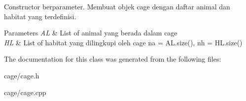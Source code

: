 Constructor berparameter. Membuat objek cage dengan daftar animal dan habitat yang terdefinisi. 


\begin{DoxyParams}{Parameters}
{\em AL} & List of animal yang berada dalam cage \\
\hline
{\em HL} & List of habitat yang dilingkupi oleh cage na = A\+L.\+size(), nh = H\+L.\+size() \\
\hline
\end{DoxyParams}


The documentation for this class was generated from the following files\+:\begin{DoxyCompactItemize}
\item 
cage/cage.\+h\item 
cage/cage.\+cpp\end{DoxyCompactItemize}

